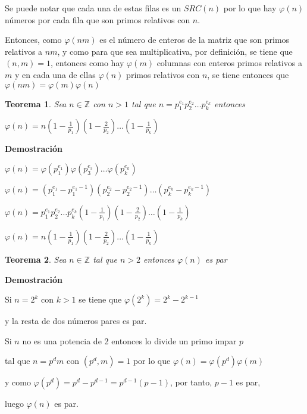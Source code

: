\documentclass[a4paper,12pt]{report}
\newtheorem*{teo}{Teorema}
\begin{document}
Se puede notar que cada una de estas filas es un $SRC(n)$ por lo que hay $\varphi(n)$ números por cada fila que son primos relativos con $n$.

Entonces, como $\varphi(nm)$ es el número de enteros de la matriz que son primos relativos a $nm$, y como para que sea multiplicativa, por definición, se tiene que $(n,m)=1$, entonces como hay $\varphi(m)$ columnas con enteros primos relativos a $m$ y en cada una de ellas $\varphi(n)$ primos relativos con $n$, se tiene entonces que $\varphi(nm)=\varphi(m)\varphi(n)$

\begin{teo}
 Sea $n\in\mathbb{Z}$ con $n>1$ tal que $n=p_1^{e_1}p_2^{e_2}\dots p_k^{e_k}$ entonces

 $\varphi(n)=n(1-\frac{1}{p_1})(1-\frac{2}{p_2})\dots(1-\frac{1}{p_k})$
\end{teo}

\textbf{Demostración}

$\varphi(n)=\varphi(p_1^{e_1})\varphi(p_3^{e_3})\dots\varphi(p_k^{e_k})$

$\varphi(n)=(p_1^{e_1}-p_1^{e_1-1})(p_2^{e_2}-p_2^{e_2-1})\dots(p_k^{e_k}-p_k^{e_k-1})$

$\varphi(n)=p_1^{e_1}p_2^{e_2}\dots p_k^{e_k}(1-\frac{1}{p_1})(1-\frac{2}{p_2})\dots(1-\frac{1}{p_k})$

$\varphi(n)=n(1-\frac{1}{p_1})(1-\frac{2}{p_2})\dots(1-\frac{1}{p_k})$

\newpage

\begin{teo}
 Sea $n\in\mathbb{Z}$ tal que $n>2$ entonces $\varphi(n)$ es par
\end{teo}


\textbf{Demostración}

Si $n=2^k$ con $k>1$ se tiene que $\varphi(2^k)=2^k-2^{k-1}$

y la resta de dos números pares es par.

Si $n$ no es una potencia de 2 entonces lo divide un primo impar $p$

tal que $n=p^dm$ con $(p^d,m)=1$ por lo que $\varphi(n)=\varphi(p^d)\varphi(m)$

y como $\varphi(p^d)=p^d-p^{d-1}=p^{d-1}(p-1)$, por tanto, $p-1$ es par,

luego  $\varphi(n)$ es par.
\end{document}
